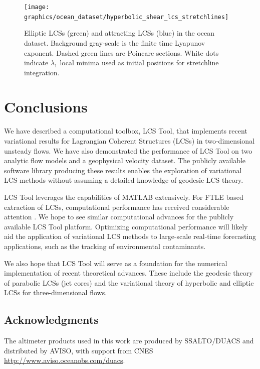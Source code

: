 \documentclass{article}
\begin{document}
\begin{figure}
\begin{center}
\texttt{[image: graphics/ocean\_dataset/hyperbolic\_shear\_lcs\_stretchlines]}
\end{center}
\caption{Elliptic LCSs (green) and attracting LCSs (blue) in the ocean dataset. Background gray-scale is the finite time Lyapunov exponent. Dashed green lines are Poincare sections. White dots indicate $\lambda_1$ local minima used as initial positions for stretchline integration.}
\label{f:ocean dataset hyperbolic shear lcs details stretchline}
\end{figure}

\clearpage

\section{Conclusions}

We have described a computational toolbox, LCS Tool, that implements recent variational results for Lagrangian Coherent Structures (LCSs) in two-dimensional unsteady flows. We have also demonstrated the performance of LCS Tool on two analytic flow models and a geophysical velocity dataset. The publicly available software library producing these results enables the exploration of variational LCS methods without assuming a detailed knowledge of geodesic LCS theory.

LCS Tool leverages the capabilities of MATLAB extensively. For FTLE based extraction of LCSs, computational performance has received considerable attention \parencite{conti12:_gpu_apu_finit_time_lyapun_expon,miron12:_anisot_lagran_coher_struc}. We hope to see similar computational advances for the publicly available LCS Tool platform. Optimizing computational performance will likely aid the application of variational LCS methods to large-scale real-time forecasting applications, such as the tracking of environmental contaminants\parencite{olascoaga12:_forec}.

We also hope that LCS Tool will serve as a foundation for the numerical
implementation of recent theoretical advances. These include the geodesic theory of parabolic LCSs (jet cores)\parencite{farazmand14:_shearless} and the variational theory of hyperbolic and elliptic LCSs for three-dimensional
flows\parencite{blazevski14:_hyper_ellip_trans_barrier_three}.

\subsection*{Acknowledgments}

The altimeter products used in this work are produced by SSALTO/DUACS and distributed by AVISO, with support from CNES \url{http://www.aviso.oceanobs.com/duacs}.

\printbibliography
\end{document}
